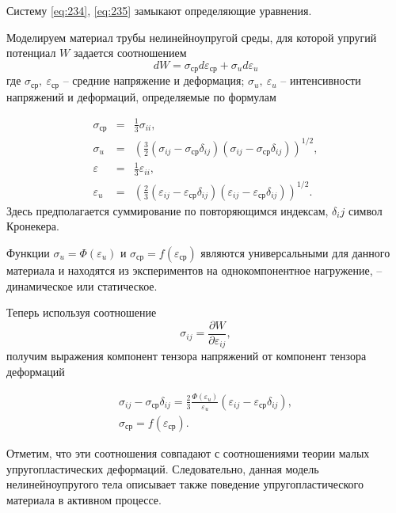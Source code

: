 \documentclass[specialist, subf, href, colorlinks=true, 14pt, final]{disser}
\theoremstyle{definition}
\newcommand{\pdfrac}[2]{\frac{\partial #1}{\partial #2}}
\begin{document}
Систему \eqref{eq:234}, \eqref{eq:235} замыкают определяющие уравнения.

Моделируем материал трубы нелинейноупругой среды, для которой упругий потенциал $W$ задается соотношением
\[
	dW = \sigma_{\text{ср}}d\varepsilon_{\text{ср}} + \sigma_{u}d\varepsilon_u
\]
где $\sigma_{\text{ср}},\ \varepsilon_{\text{ср}}$ -- средние напряжение и деформация; $\sigma_{u},\ \varepsilon_{u}$ -- интенсивности напряжений и деформаций, определяемые по формулам
\addtocounter{equation}{1}
\begin{equation}\label{eq:236}
		\begin{array}{lll}
			\sigma_{\text{ср}} &=& \displaystyle \frac{1}{3} \sigma_{ii},\\
			\sigma_u &=& \left(\displaystyle \frac{3}{2} (\sigma_{ij} - \sigma_{\text{ср}}\delta_{ij})(\sigma_{ij} - \sigma_{\text{ср}}\delta_{ij}) \right)^{1/2},\\
			\varepsilon_{} &=& \displaystyle \frac{1}{3} \varepsilon_{ii},\\
			\varepsilon_u &=& \left(\displaystyle  \frac{2}{3} (\varepsilon_{ij} - \varepsilon_{\text{ср}}\delta_{ij})(\varepsilon_{ij} - \varepsilon_{\text{ср}}\delta_{ij}) \right)^{1/2}.
		\end{array}
  	\tag{6}
\end{equation}
Здесь предполагается суммирование по повторяющимся индексам, $\delta_ij$ символ Кронекера.

Функции $\sigma_{u} = \Phi(\varepsilon_{u})$ и $\sigma_{\text{ср}} = f(\varepsilon_{\text{ср}})$ являются универсальными для данного материала и находятся из экспериментов на однокомпонентное нагружение, -- динамическое или статическое.

Теперь используя соотношение
\[ 
  \sigma_{ij} = \pdfrac{W}{\varepsilon_{ij}},
\]
получим выражения компонент тензора напряжений от компонент тензора деформаций
\addtocounter{equation}{1}
\begin{equation}\label{eq:237}
		\begin{array}{l}
			\sigma_{ij} - \sigma_{\text{ср}}\delta_{ij} =\displaystyle  \frac{2}{3} \frac{\Phi(\varepsilon_u)}{\varepsilon_u} (\varepsilon_{ij} - \varepsilon_{\text{ср}}\delta_{ij}), \\
			\sigma_{\text{ср}} = f(\varepsilon_{\text{ср}}).
		\end{array}
  	\tag{7}
\end{equation}
	
Отметим, что эти соотношения совпадают с соотношениями теории малых упругопластических деформаций. Следовательно, данная модель нелинейноупругого тела описывает также поведение упругопластического материала в активном процессе.
\end{document}
